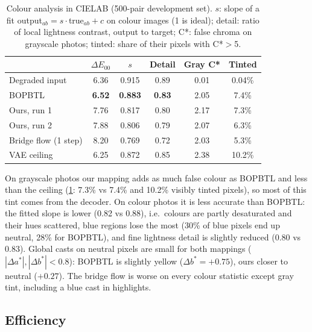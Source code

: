 \documentclass[10pt,twocolumn,letterpaper]{article}
\begin{document}
\begin{table}[t]
\centering
\small
\setlength{\tabcolsep}{3pt}
\caption{Colour analysis in CIELAB (500-pair development set). $s$: slope of a fit output$_{ab}=s\cdot$true$_{ab}+c$
on colour images (1 is ideal); detail: ratio of local lightness contrast, output to target; C*: false chroma on
grayscale photos; tinted: share of their pixels with C*$>$5.}
\label{tab:colour}
\begin{tabular}{lccccc}
\toprule
 & $\Delta E_{00}$ & $s$ & Detail & Gray C* & Tinted \\
\midrule
Degraded input & 6.36 & 0.915 & 0.89 & 0.01 & 0.04\% \\
BOPBTL & \textbf{6.52} & \textbf{0.883} & \textbf{0.83} & 2.05 & 7.4\% \\
Ours, run 1 & 7.76 & 0.817 & 0.80 & 2.17 & 7.3\% \\
Ours, run 2 & 7.88 & 0.806 & 0.79 & 2.07 & 6.3\% \\
Bridge flow (1 step) & 8.20 & 0.769 & 0.72 & 2.03 & 5.3\% \\
VAE ceiling & 6.25 & 0.872 & 0.85 & 2.38 & 10.2\% \\
\bottomrule
\end{tabular}
\end{table}

On grayscale photos our mapping adds as much false colour as BOPBTL and less than the ceiling (\cref{tab:colour}: 7.3\%
vs 7.4\% and 10.2\% visibly tinted pixels), so most of this tint comes from the decoder. On colour photos it is less
accurate than BOPBTL: the fitted slope is lower (0.82 vs 0.88), i.e.\ colours are partly desaturated and their hues
scattered, blue regions lose the most (30\% of blue pixels end up neutral, 28\% for BOPBTL), and fine lightness detail is
slightly reduced (0.80 vs 0.83). Global casts on neutral pixels are small for both mappings ($|\Delta a^*|,|\Delta b^*|<0.8$):
BOPBTL is slightly yellow ($\Delta b^*=+0.75$), ours closer to neutral ($+0.27$).
The bridge flow is worse on every colour statistic except gray tint, including a blue cast in highlights.

\subsection{Efficiency}
\label{sec:efficiency}
\end{document}
